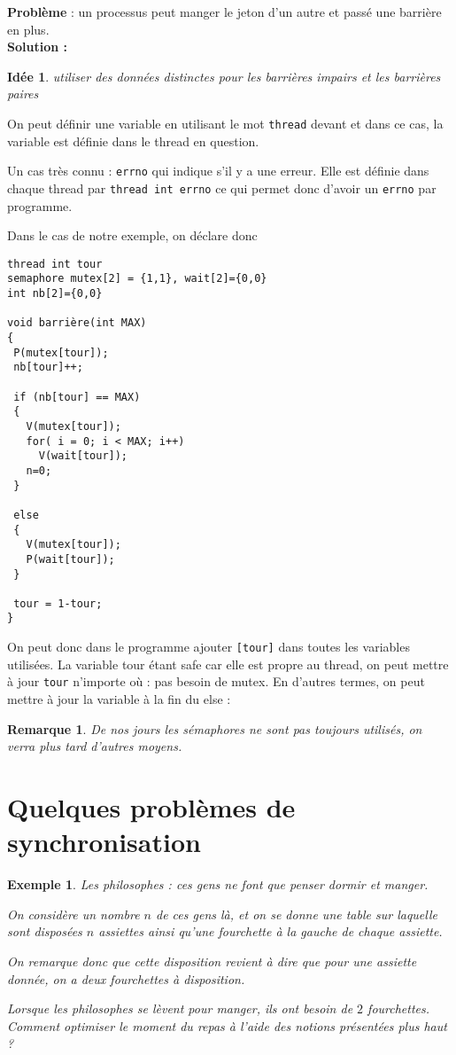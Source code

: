 \documentclass[12pt,a4paper]{report}
\newtheorem*{rem}{Remarque}
\newtheorem*{ex}{Exemple}
\newtheorem*{id}{Idée}
\begin{document}
\textbf{Problème} : un processus peut manger le jeton d'un autre et passé une barrière en plus.\\

\textbf{Solution : \\}
\begin{id} utiliser des données distinctes pour les barrières impairs et les barrières paires \end{id}

On peut définir une variable en utilisant le mot \verb?thread? devant et dans ce cas, la variable est définie dans le thread en question.

Un cas très connu : \texttt{errno} qui indique s'il y a une erreur. Elle est définie dans chaque thread par \verb?thread int errno? ce qui permet donc d'avoir un \texttt{errno} par programme.

\bigskip

Dans le cas de notre exemple, on déclare donc


\begin{verbatim}
thread int tour
semaphore mutex[2] = {1,1}, wait[2]={0,0}
int nb[2]={0,0}

void barrière(int MAX)
{
 P(mutex[tour]);
 nb[tour]++;

 if (nb[tour] == MAX)
 {
   V(mutex[tour]);
   for( i = 0; i < MAX; i++)
     V(wait[tour]);
   n=0;
 }

 else
 {
   V(mutex[tour]);
   P(wait[tour]);
 }

 tour = 1-tour;
}
\end{verbatim}

On peut donc dans le programme ajouter \verb?[tour]? dans toutes les variables utilisées.
La variable tour étant \og safe\fg{} car elle est propre  au thread, on peut mettre à jour \verb?tour? n'importe où : pas besoin de mutex. En d'autres termes, on peut mettre à jour la variable à la fin du else :



\begin{rem}
De nos jours les sémaphores ne sont pas toujours utilisés, on verra plus tard d'autres moyens.
\end{rem}

\section{Quelques problèmes de synchronisation}
\begin{ex}
  Les philosophes : ces gens ne font que penser dormir et manger.

On considère un nombre $n$ de ces gens là, et on se donne une table sur laquelle sont disposées
$n$ assiettes ainsi qu'une fourchette à la gauche de chaque assiette.

On remarque donc que cette disposition revient à dire que pour une assiette donnée, on a deux fourchettes à disposition.

Lorsque les philosophes se lèvent pour manger, ils ont besoin de $2$ fourchettes. Comment optimiser le moment du repas à l'aide des notions présentées plus haut ?
\end{ex}
\end{document}

